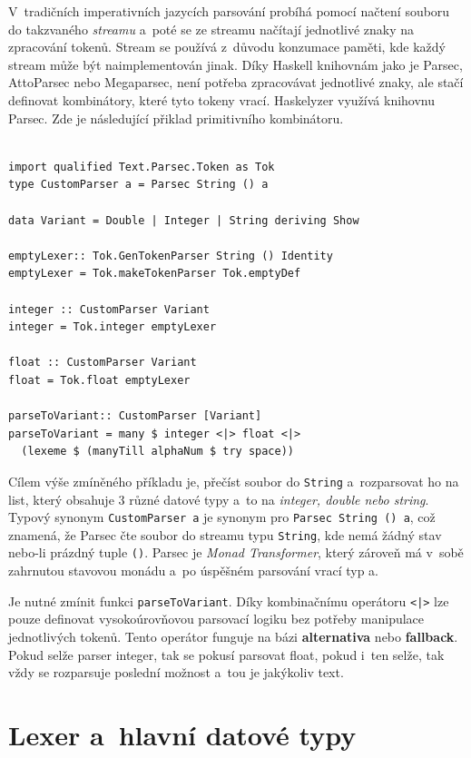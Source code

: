 \documentclass[male, czech]{kithesis}
\newcommand{\haskellInline}[1]{\colorbox{gray!10}{\texttt{#1}}}
\begin{document}
V~tradičních imperativních jazycích parsování probíhá pomocí načtení souboru 
do takzvaného \textit{streamu}
a~poté se ze streamu načítají jednotlivé znaky na zpracování tokenů. 
Stream se používá z~důvodu konzumace paměti, 
kde každý stream může být naimplementován jinak.
Díky Haskell knihovnám jako je Parsec, 
AttoParsec nebo Megaparsec,
není potřeba zpracovávat jednotlivé znaky, 
ale stačí definovat kombinátory, 
které tyto tokeny vrací. 
Haskelyzer využívá knihovnu Parsec. 
Zde je následující přiklad primitivního kombinátoru.

\begin{verbatim}

import qualified Text.Parsec.Token as Tok
type CustomParser a = Parsec String () a

data Variant = Double | Integer | String deriving Show

emptyLexer:: Tok.GenTokenParser String () Identity
emptyLexer = Tok.makeTokenParser Tok.emptyDef

integer :: CustomParser Variant 
integer = Tok.integer emptyLexer 

float :: CustomParser Variant 
float = Tok.float emptyLexer 

parseToVariant:: CustomParser [Variant]
parseToVariant = many $ integer <|> float <|> 
  (lexeme $ (manyTill alphaNum $ try space))

\end{verbatim}

Cílem výše zmíněného příkladu je, 
přečíst soubor do \haskellInline{String} 
a~rozparsovat ho na list, 
který obsahuje 3 různé datové typy 
a~to na \textit{integer, double nebo string}.
Typový synonym \haskellInline{CustomParser a} 
je synonym pro \haskellInline{Parsec String () a},
což znamená, 
že Parsec čte soubor do streamu typu \haskellInline{String}, 
kde nemá žádný stav nebo-li prázdný tuple \haskellInline{()}. 
Parsec je \textit{Monad Transformer},
který zároveň má v~sobě zahrnutou stavovou monádu
a~po úspěšném parsování vrací typ a. 

Je nutné zmínit funkci \haskellInline{parseToVariant}. 
Díky kombinačnímu operátoru \haskellInline{<|>} 
lze pouze definovat vysokoúrovňovou parsovací logiku bez potřeby manipulace jednotlivých tokenů. 
Tento operátor funguje na bázi \textbf{alternativa} nebo
\textbf{fallback}. 
Pokud selže parser integer, 
tak se pokusí parsovat float, 
pokud i~ten selže, 
tak vždy se rozparsuje poslední možnost
a~tou je jakýkoliv text.

\section{Lexer a~hlavní datové typy}
\end{document}
